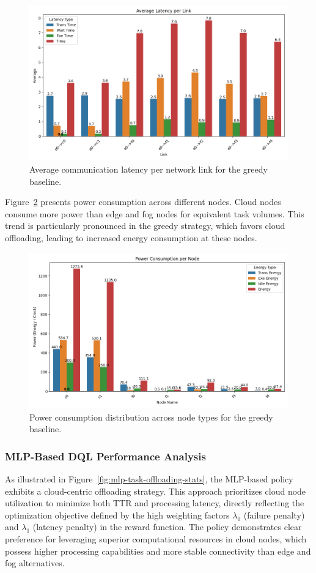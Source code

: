 \documentclass[preprint,3p,authoryear]{elsarticle}
\begin{document}
\begin{figure}[H]
    \centering
    \includegraphics[width=0.5\linewidth]{figs/Greedy/avg_latency_per_link.png}
    \caption{Average communication latency per network link for the greedy baseline.}
    \label{fig:greedy-avg-latency}
\end{figure}

Figure~\ref{fig:greedy-power-consumption} presents power consumption across different nodes. Cloud nodes consume more power than edge and fog nodes for equivalent task volumes. This trend is particularly pronounced in the greedy strategy, which favors cloud offloading, leading to increased energy consumption at these nodes.

\begin{figure}[H]
    \centering
    \includegraphics[width=0.5\linewidth]{figs/Greedy/power_consumption_per_node.png}
    \caption{Power consumption distribution across node types for the greedy baseline.}
    \label{fig:greedy-power-consumption}
\end{figure}


\subsubsection{MLP-Based DQL Performance Analysis}\label{subsubsec:mlp-DQL-analysis}

As illustrated in Figure~\ref{fig:mlp-task-offloading-stats}, the MLP-based policy exhibits a cloud-centric offloading strategy. This approach prioritizes cloud node utilization to minimize both TTR and processing latency, directly reflecting the optimization objective defined by the high weighting factors $\lambda_0$ (failure penalty) and $\lambda_1$ (latency penalty) in the reward function. The policy demonstrates clear preference for leveraging superior computational resources in cloud nodes, which possess higher processing capabilities and more stable connectivity than edge and fog alternatives.
\end{document}
